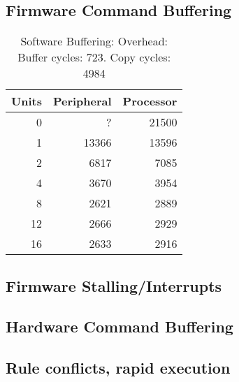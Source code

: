 \documentclass[a4paper,8pt]{report}
\begin{document}


\subsection{Firmware Command Buffering}

\begin{table}
  \centering
  \begin{tabular}{r|rr}
    \toprule
    Units & Peripheral & Processor\\
    \midrule
    0  &     ? & 21500 \\
    1  & 13366 & 13596 \\
    2  &  6817 &  7085 \\
    4  &  3670 &  3954 \\
    8  &  2621 &  2889 \\
    12 &  2666 &  2929 \\
    16 &  2633 &  2916 \\
    \bottomrule
  \end{tabular}
  \caption{Software Buffering: Overhead: Buffer cycles: 723. Copy cycles: 4984}
\end{table}
% 









\subsection{Firmware Stalling/Interrupts}

\subsection{Hardware Command Buffering}

\subsection{Rule conflicts, rapid execution}
\end{document}
